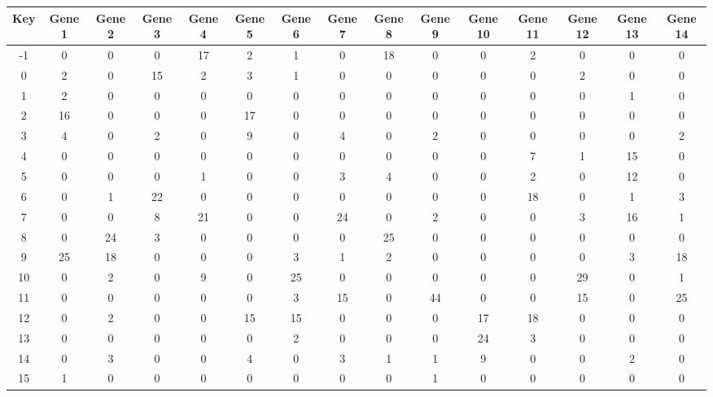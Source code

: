 \begin{tabular}{|c|c|c|c|c|c|c|c|c|c|c|c|c|c|c|}
\hline
Key & Gene 1 & Gene 2 & Gene 3 & Gene 4 & Gene 5 & Gene 6 & Gene 7 & Gene 8 & Gene 9 & Gene 10 & Gene 11 & Gene 12 & Gene 13 & Gene 14 \\
\hline
-1 & 0 & 0 & 0 & 17 & 2 & 1 & 0 & 18 & 0 & 0 & 2 & 0 & 0 & 0 \\
0 & 2 & 0 & 15 & 2 & 3 & 1 & 0 & 0 & 0 & 0 & 0 & 2 & 0 & 0 \\
1 & 2 & 0 & 0 & 0 & 0 & 0 & 0 & 0 & 0 & 0 & 0 & 0 & 1 & 0 \\
2 & 16 & 0 & 0 & 0 & 17 & 0 & 0 & 0 & 0 & 0 & 0 & 0 & 0 & 0 \\
3 & 4 & 0 & 2 & 0 & 9 & 0 & 4 & 0 & 2 & 0 & 0 & 0 & 0 & 2 \\
4 & 0 & 0 & 0 & 0 & 0 & 0 & 0 & 0 & 0 & 0 & 7 & 1 & 15 & 0 \\
5 & 0 & 0 & 0 & 1 & 0 & 0 & 3 & 4 & 0 & 0 & 2 & 0 & 12 & 0 \\
6 & 0 & 1 & 22 & 0 & 0 & 0 & 0 & 0 & 0 & 0 & 18 & 0 & 1 & 3 \\
7 & 0 & 0 & 8 & 21 & 0 & 0 & 24 & 0 & 2 & 0 & 0 & 3 & 16 & 1 \\
8 & 0 & 24 & 3 & 0 & 0 & 0 & 0 & 25 & 0 & 0 & 0 & 0 & 0 & 0 \\
9 & 25 & 18 & 0 & 0 & 0 & 3 & 1 & 2 & 0 & 0 & 0 & 0 & 3 & 18 \\
10 & 0 & 2 & 0 & 9 & 0 & 25 & 0 & 0 & 0 & 0 & 0 & 29 & 0 & 1 \\
11 & 0 & 0 & 0 & 0 & 0 & 3 & 15 & 0 & 44 & 0 & 0 & 15 & 0 & 25 \\
12 & 0 & 2 & 0 & 0 & 15 & 15 & 0 & 0 & 0 & 17 & 18 & 0 & 0 & 0 \\
13 & 0 & 0 & 0 & 0 & 0 & 2 & 0 & 0 & 0 & 24 & 3 & 0 & 0 & 0 \\
14 & 0 & 3 & 0 & 0 & 4 & 0 & 3 & 1 & 1 & 9 & 0 & 0 & 2 & 0 \\
15 & 1 & 0 & 0 & 0 & 0 & 0 & 0 & 0 & 1 & 0 & 0 & 0 & 0 & 0 \\
\hline
\end{tabular}